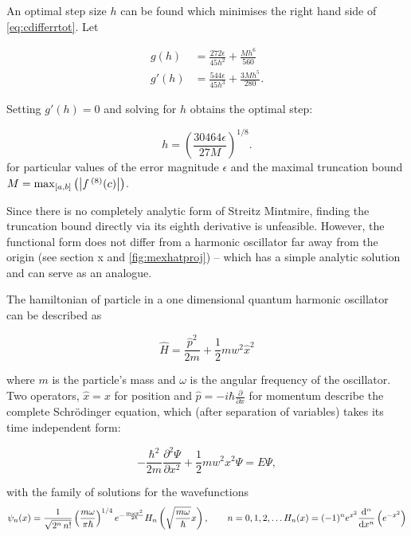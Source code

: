 An optimal step size $h$ can be found which minimises the right hand side of \cref{eq:cdifferrtot}. Let

\begin{align}
g(h) &= \frac{272\epsilon}{45h^2}+\frac{Mh^6}{560}\\[0.2cm]
g'(h) &= \frac{544\epsilon}{45h^3}+\frac{3Mh^5}{280}.
\end{align}

Setting $g'(h) = 0$ and solving for $h$ obtains the optimal step:

\begin{equation}
h = \left(\frac{30464\epsilon}{27M}\right)^{1/8}.\label{eq:stepgen}
\end{equation}
for particular values of the error magnitude $\epsilon$ and the maximal truncation bound $M = \mathrm{max}_{[a,b]}\left(\left\lvert f\,^{(8)}(c)\right\rvert\right)$.

Since there is no completely analytic form of Streitz Mintmire, finding the truncation bound directly via its eighth derivative is unfeasible.
However, the functional form does not differ from a harmonic oscillator far away from the origin (see section x and \cref{fig:mexhatproj}) -- which has a simple analytic solution and can serve as an analogue.

The hamiltonian of particle in a one dimensional quantum harmonic oscillator can be described as

\begin{equation}
\widehat{H} = \frac{\widehat{p}^2}{2m}+\frac{1}{2}mw^2\widehat{x}^2\label{eq:hamho}
\end{equation}

where $m$ is the particle's mass and $ω$ is the angular frequency of the oscillator.
Two operators, $\widehat{x} = x$ for position and $\widehat{p} = -i\hbar \frac{\partial}{\partial x}$ for momentum describe the complete Schr\"{o}dinger equation, which (after separation of variables) takes its time independent form:

\begin{equation}
-\frac{\hbar^2}{2m}\frac{\partial^2 \Psi}{\partial x^2}+\frac{1}{2}mw^2x^2 \Psi = E\Psi,
\end{equation}

with the family of solutions for the wavefunctions
\begin{equation}\psi_n(x) = \frac{1}{\sqrt{2^n\,n!}}\left(\frac{m\omega}{\pi \hbar}\right)^{1/4}e^{
- \frac{m\omega x^2}{2 \hbar}} H_n\left(\sqrt{\frac{m\omega}{\hbar}} x \right),\qquad n = 0,1,2,\ldots\\
H_n(x)=(-1)^n e^{x^2}\frac{\mathrm{d}^n}{\mathrm{d}x^n}\left(e^{-x^2}\right)
\end{equation}


